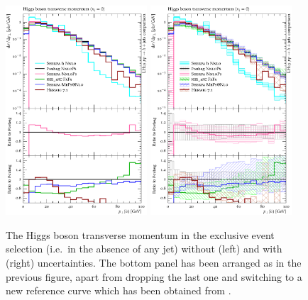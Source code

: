 \begin{figure}[t!]
  \centering
  \includegraphics[width=0.47\textwidth]{figures/hjetscomp_u_H_pT_excl.pdf}
  \hfill
  \includegraphics[width=0.47\textwidth]{figures/hjetscomp_H_pT_excl.pdf}
  \caption{\label{fig:hjetscomp:results:exclobs:hpt}%
    The Higgs boson transverse momentum in the exclusive event
    selection (i.e.~in the absence of any jet) without (left) and with
    (right) uncertainties. The bottom panel has been arranged as in
    the previous figure, apart from dropping the last one and
    switching to a new reference curve which has been obtained from
    \Powheg \NNLOPS.}
\end{figure}

